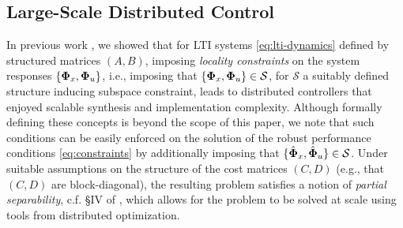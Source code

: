
\subsection{Large-Scale Distributed Control}
\label{sec:extensions}
In previous work \cite{wang2014localized,wang2016localized,wang2018separable}, we showed that for LTI systems \eqref{eq:lti-dynamics} defined by structured matrices $(A,B)$, imposing \emph{locality constraints} on the system responses $\{\boldsymbol{\Phi}_x,\boldsymbol{\Phi}_u\}$, i.e., imposing that $\{\boldsymbol{\Phi}_x,\boldsymbol{\Phi}_u\} \in \mathcal{S}$, for $\mathcal{S}$ a suitably defined structure inducing subspace constraint, leads to distributed controllers that enjoyed scalable synthesis and implementation complexity.  Although formally defining these concepts is beyond the scope of this paper, we note that such conditions can be easily enforced on the solution of the robust performance conditions \eqref{eq:constraints} by additionally imposing that $\{\hat{\boldsymbol{\Phi}}_x,\hat{\boldsymbol{\Phi}}_u\}\in\mathcal{S}$.   Under suitable assumptions on the structure of the cost matrices $(C,D)$ (e.g., that $(C,D)$ are block-diagonal), the resulting problem satisfies a notion of \emph{partial separability}, c.f. \S IV of \cite{wang2018separable}, which allows for the problem to be solved at scale using tools from distributed optimization.  

